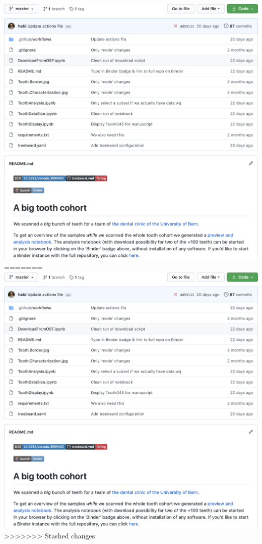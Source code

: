 \begin{frame}
\begin{columns}
\begin{column}{0.5\linewidth}
{				\href{https://mybinder.org/v2/gh/habi/zmk-tooth-cohort/master?filepath=ToothAnalysis.ipynb}{\includegraphics[height=\imheight]{./images/zmk/binder}}%
=======
				\href{https://mybinder.org/v2/gh/habi/zmk-tooth-cohort/master?filepath=ToothAnalysis.ipynb}{\includegraphics[height=\imageheight]{./images/binder}}%
>>>>>>> Stashed changes
				}%
		\end{column}
	\end{columns}
\end{frame}

